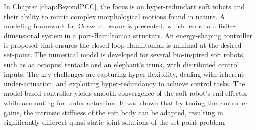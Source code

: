 In Chapter \ref{chap:BeyondPCC}, the focus is on hyper-redundant soft robots and their ability to mimic complex morphological motions found in nature. A modeling framework for Cosserat beams is presented, which leads to a finite-dimensional system in a port-Hamiltonian structure. An energy-shaping controller is proposed that ensures the closed-loop Hamiltonian is minimal at the desired set-point. The numerical model is developed for several bio-inspired soft robots, such as an octopus' tentacle and an elephant's trunk, with distributed control inputs. The key challenges are capturing hyper-flexibility, dealing with inherent under-actuation, and exploiting hyper-redundancy to achieve control tasks. The model-based controller yields smooth convergence of the soft robot's end-effector while accounting for under-actuation. It was shown that by tuning the controller gains, the intrinsic stiffness of the soft body can be adapted, resulting in significantly different quasi-static joint solutions of the set-point problem.


